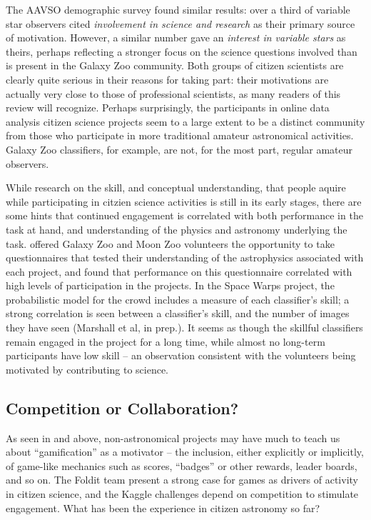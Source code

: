 \documentclass{ar2e}
\begin{document}
The AAVSO demographic survey \citep{P+P2012} found similar results: over a third
of variable star observers cited {\it involvement in science and research} as
their primary source of motivation. However, a similar number gave an {\it
interest in variable stars} as theirs, perhaps reflecting a stronger focus on
the science questions involved than is present in the Galaxy Zoo community. Both
groups of citizen scientists are clearly quite serious in their reasons for
taking part: their motivations are actually very close to those of professional
scientists, as many readers of this review will recognize. Perhaps surprisingly,
the participants in online data analysis citizen science projects seem to a
large extent to be a distinct community from those who participate in more
traditional amateur astronomical activities. Galaxy Zoo classifiers, for
example, are not, for the most part, regular amateur observers. 

While research on the skill, and conceptual understanding, that  people aquire
while participating in citzien science activities is still in its early stages,
there are some hints that continued engagement is correlated with both
performance in the task at hand, and understanding of the physics and astronomy
underlying the task. \citet{Prather++2013} offered Galaxy Zoo and Moon Zoo
volunteers the opportunity to take questionnaires that tested their
understanding of the astrophysics associated with each project, and found that
performance on this questionnaire correlated with high levels of participation
in the projects. In the Space Warps project, the probabilistic model for the
crowd includes a measure of each classifier's skill; a strong correlation is
seen between a classifier's skill, and the number of images they have seen
(Marshall et al, in prep.). It seems as though the skillful classifiers remain
engaged in the project for a long time, while almost no long-term participants
have low skill -- an observation consistent with the volunteers being motivated
by contributing to science.



\subsection{Competition or Collaboration?}
\label{sec:crowd:gamification}

As seen in  and   above,
non-astronomical projects may have much to teach us about ``gamification'' as a
motivator -- the inclusion, either explicitly or implicitly, of game-like
mechanics such as scores, ``badges'' or other rewards, leader boards, and so on.
The Foldit team present a strong case for games as drivers of activity in
citizen science, and the Kaggle challenges depend on competition to stimulate
engagement. What has been the experience in citizen astronomy so far?
\end{document}
